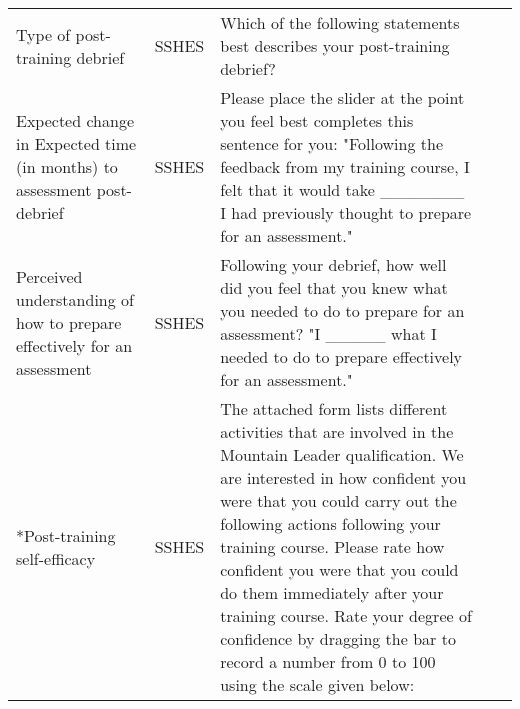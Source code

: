\documentclass[
  12pt,
  a4paper,
]{book}
\begin{document}
\begin{landscape}
\begin{longtable}[t]{>{\raggedright\arraybackslash}p{4cm}>{\raggedright\arraybackslash}p{1.5cm}>{\raggedright\arraybackslash}p{15cm}>{\raggedleft\arraybackslash}p{.75cm}>{\raggedleft\arraybackslash}p{.75cm}}
Type of post-training debrief & SSHES & Which of the following statements best describes your post-training debrief? & 1 & 1\\
Expected change in Expected time (in months) to assessment post-debrief & SSHES & Please place the slider at the point you feel best completes this sentence for you: "Following the feedback from my training course, I felt that it would take \_\_\_\_\_\_\_ I had previously thought to prepare for an assessment." & 1 & 1\\
Perceived understanding of how to prepare effectively for an assessment & SSHES & Following your debrief, how well did you feel that you knew what you needed to do to prepare for an assessment? "I \_\_\_\_\_ what I needed to do to prepare effectively for an assessment." & 1 & 1\\
\addlinespace
*Post-training self-efficacy & SSHES & The attached form lists different activities that are involved in the Mountain Leader qualification. We are interested in how confident you were that you could carry out the following actions following your training course. Please rate how confident you were that you could do them immediately after your training course. Rate your degree of confidence by dragging the bar to record a number from 0 to 100 using the scale given below:


\end{longtable}
\end{landscape}
\end{document}
